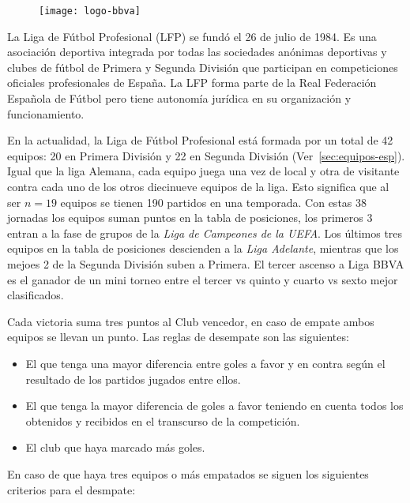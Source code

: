 \begin{figure}[!htb]\centering
   \begin {minipage}{0.5\textwidth}
     \texttt{[image: logo-bbva]}
   \end{minipage}
\end{figure}

La Liga de Fútbol Profesional (LFP) se fundó el 26 de julio de 1984. Es una asociación deportiva integrada por todas las sociedades anónimas deportivas y clubes de fútbol de Primera y Segunda División que participan en competiciones oficiales profesionales de España. La LFP forma parte de la Real Federación Española de Fútbol pero tiene autonomía jurídica en su organización y funcionamiento. 

En la actualidad, la Liga de Fútbol Profesional está formada por un total de 42 equipos: 20 en Primera División y 22 en Segunda División (Ver~\cref{sec:equipos-esp}). Igual que la liga Alemana, cada equipo juega una vez de local y otra de visitante contra cada uno de los otros diecinueve equipos de la liga. Esto significa que al ser $n=19$ equipos se tienen 190 partidos en una temporada. Con estas 38 jornadas los equipos suman puntos en la tabla de posiciones, los primeros 3 entran a la fase de grupos de la \emph{Liga de Campeones de la UEFA}. Los últimos tres equipos en la tabla de posiciones descienden a la \emph{Liga Adelante}, mientras que los mejoes 2 de la Segunda División suben a Primera. El tercer ascenso a Liga BBVA es el ganador de un mini torneo entre el tercer vs quinto y cuarto vs sexto mejor clasificados.

Cada victoria suma tres puntos al Club vencedor, en caso de empate ambos equipos se llevan un punto. Las reglas de desempate son las siguientes: 
\begin{itemize}

	\item El que tenga una mayor diferencia entre goles a favor y en contra según el resultado de los partidos jugados entre ellos.

	\item El que tenga la mayor diferencia de goles a favor teniendo en cuenta todos los obtenidos y recibidos en el transcurso de la competición.

	\item El club que haya marcado más goles.

\end{itemize}

En caso de que haya tres equipos o más empatados se siguen los siguientes criterios para el desmpate:

